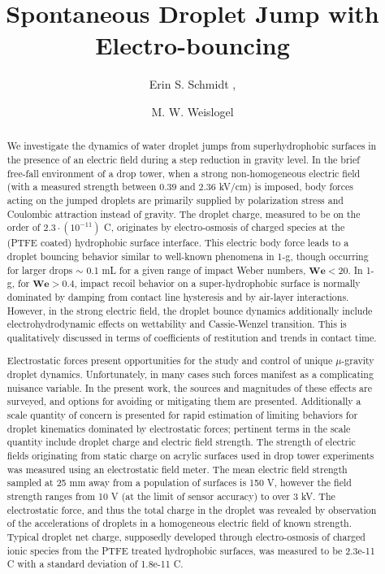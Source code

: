 \documentclass{jfm}
\title{Spontaneous Droplet Jump with Electro-bouncing}
\author{Erin S. Schmidt\aff{1}
  \corresp{\email{esch2@pdx.edu}},
 \and M. W.  Weislogel\aff{1}}
\affiliation{\aff{1}Department of Mechanical Engineering, Portland State University,
Portland, OR 97211, USA
}
\begin{document}
\maketitle

\begin{abstract}
We investigate the dynamics of water droplet jumps from superhydrophobic surfaces in the presence of an electric field during a step reduction in gravity level. In the brief free-fall environment of a drop tower, when a strong non-homogeneous electric field (with a measured strength between $0.39$ and $2.36$ kV/cm) is imposed, body forces acting on the jumped droplets are primarily supplied by polarization stress and Coulombic attraction instead of gravity. The droplet charge, measured to be on the order of $2.3 \cdot(10^{-11})$ C, originates by electro-osmosis of charged species at the (PTFE coated) hydrophobic surface interface. This electric body force leads to a droplet bouncing behavior similar to well-known phenomena in 1-g, though occurring for larger drops $\sim \! \!$ 0.1 mL for a given range of impact Weber numbers, $\mathbf{We} < 20$. In 1-g, for $\mathbf{We} > 0.4$, impact recoil behavior on a super-hydrophobic surface is normally dominated by damping from contact line hysteresis and by air-layer interactions. However, in the strong electric field, the droplet bounce dynamics additionally include electrohydrodynamic effects on wettability and Cassie-Wenzel transition. This is qualitatively discussed in terms of coefficients of restitution and trends in contact time. 

Electrostatic forces present opportunities for the study and control of unique $\mu$-gravity droplet dynamics. Unfortunately, in many cases such forces manifest as a complicating nuisance variable. In the present work, the sources and magnitudes of these effects are surveyed, and options for avoiding or mitigating them are presented. Additionally a scale quantity of concern is presented for rapid estimation of limiting behaviors for droplet kinematics dominated by electrostatic forces; pertinent terms in the scale quantity include droplet charge and electric field strength. The strength of electric fields originating from static charge on acrylic surfaces used in drop tower experiments was measured using an electrostatic field meter. The mean electric field strength sampled at 25 mm away from a population of surfaces is 150 V, however the field strength ranges from 10 V (at the limit of sensor accuracy) to over 3 kV. The electrostatic force, and thus the total charge in the droplet was revealed by observation of the accelerations of droplets in a homogeneous electric field of known strength. Typical droplet net charge, supposedly developed through electro-osmosis of charged ionic species from the PTFE treated hydrophobic surfaces, was measured to be 2.3e-11 C with a standard deviation of 1.8e-11 C.\end{abstract}
\end{document}
